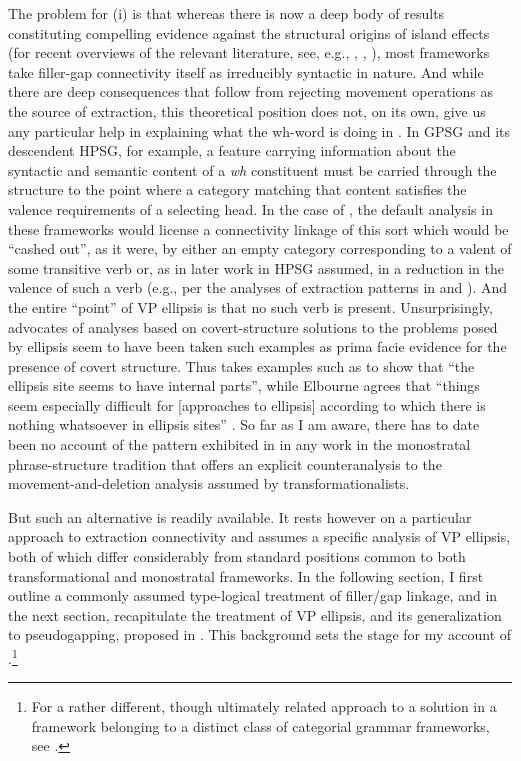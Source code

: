 \documentclass[output=paper,colorlinks,citecolor=brown]{langscibook}
\begin{document}
The problem for (i) is that whereas there is now a deep body of
results constituting compelling evidence against the structural
origins of island effects (for recent overviews of the relevant
literature, see, e.g., \citet{chaves-putnam2020}, \citet{kubotalevineBook}, \citet{liu2022structural}),
most frameworks take filler-gap connectivity itself as irreducibly
syntactic in nature. And while there are deep consequences that follow
from rejecting movement operations as the source of extraction, this
theoretical position does not, on its own, give us any particular help
in explaining what the wh-word is doing in . In
GPSG and its descendent HPSG, for example, a feature carrying
information about the syntactic and semantic content of a \textit{wh}
constituent must be carried through the structure to the point where a
category matching that content satisfies the valence requirements of a
selecting head. In the case of , the default analysis
in these frameworks would license a connectivity linkage of this sort
which would be ``cashed out'', as it were, by either an empty category
corresponding to a valent of some transitive verb or, as in later
work in HPSG assumed, in a reduction in the valence of such a verb
(e.g., per the analyses of extraction patterns in \citet{NoordBouma94} and
\citet{BoumaMaloufea01}). And the entire ``point'' of VP ellipsis is that no such
verb is present. Unsurprisingly, advocates of analyses based on
covert-structure solutions to the problems posed by ellipsis seem to
have been taken such examples as prima facie evidence for the presence
of covert structure.  Thus \citet{johnson2001} takes examples such as
 to show that ``the ellipsis site seems to have
internal parts'', while Elbourne agrees that ``things seem especially
difficult for [approaches to ellipsis] according to which there is
nothing whatsoever in ellipsis sites'' \citep[216]{Elbourne2008}.  So far as I
am aware, there has to date been no account of the pattern exhibited
in  in any work in the monostratal phrase-structure
tradition that offers an explicit counteranalysis to the
movement-and-deletion analysis assumed by transformationalists.

But such an alternative is readily available. It rests however on a
particular approach to extraction connectivity and assumes a specific
analysis of VP ellipsis, both of which differ considerably from
standard positions common to both transformational and monostratal
frameworks. In the following section, I first outline a commonly
assumed type-logical treatment of filler/gap linkage, and in the next
section, recapitulate the treatment of VP ellipsis, and its
generalization to pseudogapping, proposed in
\citet{kubota-levine-pseudo}. This background sets the stage for my account
of .\footnote{For a rather different, though
ultimately related approach to a solution in a framework belonging to
a distinct class of categorial grammar frameworks, see \citet{jacobson1992}.}
\end{document}
